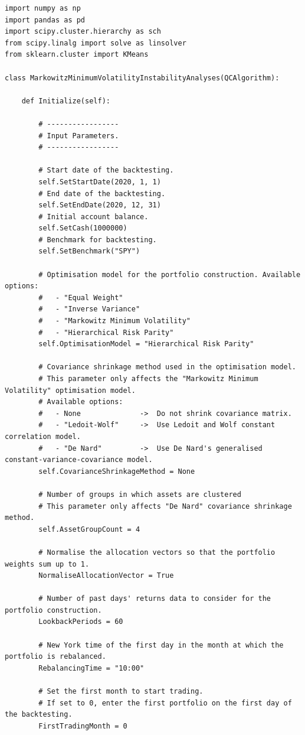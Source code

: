 \begin{verbatim}
import numpy as np
import pandas as pd
import scipy.cluster.hierarchy as sch
from scipy.linalg import solve as linsolver
from sklearn.cluster import KMeans

class MarkowitzMinimumVolatilityInstabilityAnalyses(QCAlgorithm):

    def Initialize(self):
        
        # -----------------
        # Input Parameters.
        # -----------------
        
        # Start date of the backtesting.
        self.SetStartDate(2020, 1, 1)
        # End date of the backtesting.
        self.SetEndDate(2020, 12, 31)
        # Initial account balance.
        self.SetCash(1000000)
        # Benchmark for backtesting.
        self.SetBenchmark("SPY")
        
        # Optimisation model for the portfolio construction. Available options:
        #   - "Equal Weight"
        #   - "Inverse Variance"
        #   - "Markowitz Minimum Volatility"
        #   - "Hierarchical Risk Parity"
        self.OptimisationModel = "Hierarchical Risk Parity"
        
        # Covariance shrinkage method used in the optimisation model.
        # This parameter only affects the "Markowitz Minimum Volatility" optimisation model.
        # Available options:
        #   - None              ->  Do not shrink covariance matrix.
        #   - "Ledoit-Wolf"     ->  Use Ledoit and Wolf constant correlation model.
        #   - "De Nard"         ->  Use De Nard's generalised constant-variance-covariance model.
        self.CovarianceShrinkageMethod = None
        
        # Number of groups in which assets are clustered
        # This parameter only affects "De Nard" covariance shrinkage method.
        self.AssetGroupCount = 4
        
        # Normalise the allocation vectors so that the portfolio weights sum up to 1.
        NormaliseAllocationVector = True
        
        # Number of past days' returns data to consider for the portfolio construction.
        LookbackPeriods = 60
        
        # New York time of the first day in the month at which the portfolio is rebalanced.
        RebalancingTime = "10:00"
        
        # Set the first month to start trading.
        # If set to 0, enter the first portfolio on the first day of the backtesting.
        FirstTradingMonth = 0
        

\end{verbatim}
